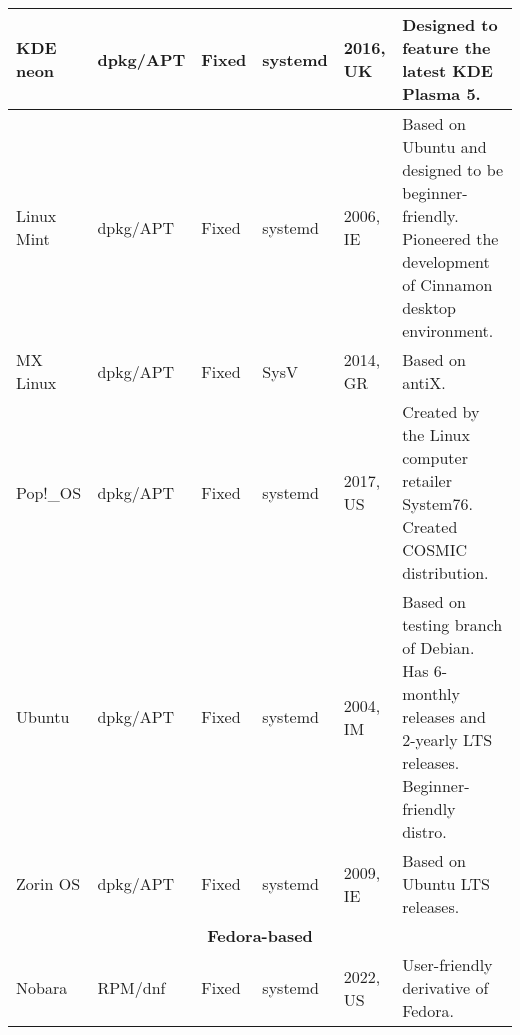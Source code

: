 \documentclass[12pt,a4paper,landscape]{article}
\begin{document}
\begin{longtable}{|p{3.5cm}|p{2.3cm}|p{1.6cm}|p{2.4cm}|p{2.0cm}|p{14.7cm}|}
			KDE neon & dpkg/APT & Fixed & systemd & 2016, UK & Designed to feature the latest KDE Plasma 5. \\\hline
			Linux Mint & dpkg/APT & Fixed & systemd & 2006, IE & Based on Ubuntu and designed to be beginner-friendly. Pioneered the development of Cinnamon desktop environment. \\\hline
			MX Linux & dpkg/APT & Fixed & SysV & 2014, GR & Based on antiX. \\\hline
			Pop!\_OS & dpkg/APT & Fixed & systemd & 2017, US & Created by the Linux computer retailer System76. Created COSMIC distribution. \\\hline
			Ubuntu & dpkg/APT & Fixed & systemd & 2004, IM & Based on testing branch of Debian. Has 6-monthly releases and 2-yearly LTS releases. Beginner-friendly distro. \\\hline
			Zorin OS & dpkg/APT & Fixed & systemd & 2009, IE & Based on Ubuntu LTS releases. \\\hline
			\multicolumn{6}{|c|}{\textbf{Fedora-based}} \\\hline			
			Nobara & RPM/dnf & Fixed & systemd & 2022, US & User-friendly derivative of Fedora. \\\hline
	\end{longtable}
	
\end{document}
